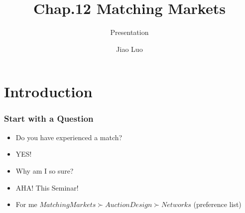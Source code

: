 \documentclass{beamer}
\title{Chap.12 Matching Markets}
\subtitle{Presentation}
\author{Jiao Luo}
\institute[]{TUM}
\begin{document}
\begin{frame}
\titlepage
\end{frame}

\section{Introduction}
\begin{frame} 
		\tableofcontents[currentsection]
\end{frame}

\begin{frame}
	\frametitle{Start with a Question}
	\begin{itemize}
		\pause
		\item Do you have experienced a match?
		\pause
		\item YES!
		\pause 
		\item Why am I so sure?
		\pause
		\vspace{1cm}
		\item AHA! This Seminar!
		\item For me $Matching Markets \succ Auction Design \succ Networks$ (preference list)
	\end{itemize}
\end{frame}



\end{document}
